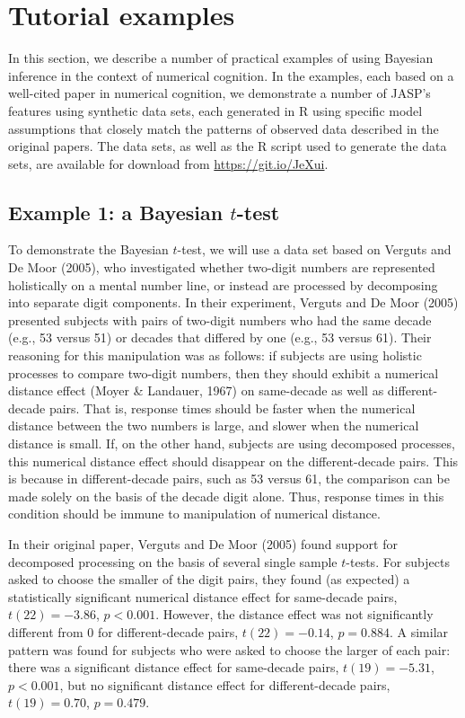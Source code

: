 \documentclass[english,,doc,floatsintext]{apa6}
\begin{document}
\hypertarget{tutorial-examples}{%
\section{Tutorial examples}\label{tutorial-examples}}

In this section, we describe a number of practical examples of using Bayesian inference in the context of numerical cognition. In the examples, each based on a well-cited paper in numerical cognition, we demonstrate a number of JASP's features using synthetic data sets, each generated in R using specific model assumptions that closely match the patterns of observed data described in the original papers. The data sets, as well as the R script used to generate the data sets, are available for download from \url{https://git.io/JeXui}.

\hypertarget{example-1-a-bayesian-t-test}{%
\subsection{\texorpdfstring{Example 1: a Bayesian \(t\)-test}{Example 1: a Bayesian t-test}}\label{example-1-a-bayesian-t-test}}

To demonstrate the Bayesian \(t\)-test, we will use a data set based on Verguts and De Moor (2005), who investigated whether two-digit numbers are represented holistically on a mental number line, or instead are processed by decomposing into separate digit components. In their experiment, Verguts and De Moor (2005) presented subjects with pairs of two-digit numbers who had the same decade (e.g., 53 versus 51) or decades that differed by one (e.g., 53 versus 61). Their reasoning for this manipulation was as follows: if subjects are using holistic processes to compare two-digit numbers, then they should exhibit a numerical distance effect (Moyer \& Landauer, 1967) on same-decade as well as different-decade pairs. That is, response times should be faster when the numerical distance between the two numbers is large, and slower when the numerical distance is small. If, on the other hand, subjects are using decomposed processes, this numerical distance effect should disappear on the different-decade pairs. This is because in different-decade pairs, such as 53 versus 61, the comparison can be made solely on the basis of the decade digit alone. Thus, response times in this condition should be immune to manipulation of numerical distance.

In their original paper, Verguts and De Moor (2005) found support for decomposed processing on the basis of several single sample \(t\)-tests. For subjects asked to choose the smaller of the digit pairs, they found (as expected) a statistically significant numerical distance effect for same-decade pairs, \(t(22) = -3.86\), \(p<0.001\). However, the distance effect was not significantly different from 0 for different-decade pairs, \(t(22)=-0.14\), \(p=0.884\). A similar pattern was found for subjects who were asked to choose the larger of each pair: there was a significant distance effect for same-decade pairs, \(t(19)=-5.31\), \(p<0.001\), but no significant distance effect for different-decade pairs, \(t(19)=0.70\), \(p=0.479\).
\end{document}
